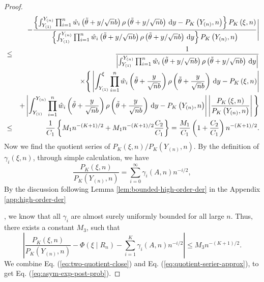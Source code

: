 \begin{proof}
\begin{eqnarray}
 &  & -\frac{\left\{ \int_{Y_{\left(1\right)}}^{Y_{\left(n\right)}}\prod_{i=1}^{n}\hat{w}_{i}\left(\tilde{\theta}+y/\sqrt{n}b\right)\rho\left(\tilde{\theta}+y/\sqrt{n}b\right)\,\mathrm{d} y-P_{K}\left(Y_{\left(n\right)},n\right)\right\} P_{K}\left(\xi,n\right)}{\left\{ \int_{Y_{\left(1\right)}}^{Y_{\left(n\right)}}\prod_{i=1}^{n}\hat{w}_{i}\left(\tilde{\theta}+y/\sqrt{n}b\right)\rho\left(\tilde{\theta}+y/\sqrt{n}b\right)\,\mathrm{d} y\right\} P_{K}\left(Y_{\left(n\right)},n\right)}\Bigg|\nonumber \\
 & \le & \frac{1}{\left|\int_{Y_{\left(1\right)}}^{Y_{\left(n\right)}}\prod_{i=1}^{n}\hat{w}_{i}\left(\tilde{\theta}+y/\sqrt{n}b\right)\rho\left(\tilde{\theta}+y/\sqrt{n}b\right)\,\mathrm{d} y\right|}\\
 && \times\Bigg\{\left|\int_{Y_{\left(1\right)}}^{\xi}\prod_{i=1}^{n}\hat{w}_{i}\left(\tilde{\theta}+\frac{y}{\sqrt{n}b}\right)\rho\left(\tilde{\theta}+\frac{y}{\sqrt{n}b}\right)\,\mathrm{d} y-P_{K}\left(\xi,n\right)\right|\\
 &  & +\left|\int_{Y_{\left(1\right)}}^{Y_{\left(n\right)}}\prod_{i=1}^{n}\hat{w}_{i}\left(\tilde{\theta}+\frac{y}{\sqrt{n}b}\right)\rho\left(\tilde{\theta}+\frac{y}{\sqrt{n}b}\right)\,\mathrm{d} y-P_{K}\left(Y_{\left(n\right)},n\right)\right|\left|\frac{P_{K}\left(\xi,n\right)}{P_{K}\left(Y_{\left(n\right)},n\right)}\right|\Bigg\}\nonumber \\
 & \le & \frac{1}{C_{1}}\left\{ M_{1}n^{-\left(K+1\right)/2}+M_{1}n^{-\left(K+1\right)/2}\frac{C_{2}}{C_{1}}\right\} =\frac{M_{1}}{C_{1}}\left(1+\frac{C_{2}}{C_{1}}\right)n^{-\left(K+1\right)/2}.\label{eq:two-quotient-close}
\end{eqnarray}
Now we find the quotient series of $P_{K}\left(\xi,n\right)/P_{K}\left(Y_{\left(n\right)},n\right)$.
By the definition of $\gamma_{i}\left(\xi,n\right)$, through simple
calculation, we have 
\[
\frac{P_{K}\left(\xi,n\right)}{P_{K}\left(Y_{\left(n\right)},n\right)}=\sum_{i=0}^{\infty}\gamma_{i}\left(A,n\right)n^{-i/2},
\]
 By the discussion following Lemma \ref{lem:bounded-high-order-der} in the Appendix \ref{app:high-order-der} {},
we know that all $\gamma_{i}$ are almost surely uniformly bounded
for all large $n$. Thus, there exists a constant $M_{3}$, such that
\begin{equation}
\left|\frac{P_{K}\left(\xi,n\right)}{P_{K}\left(Y_{\left(n\right)},n\right)}-\Phi\left(\xi\mid R_{n}\right)-\sum_{i=1}^{K}\gamma_{i}\left(A,n\right)n^{-i/2}\right|\le M_{3}n^{-\left(K+1\right)/2}.\label{eq:quotient-serier-approx}
\end{equation}
We combine Eq. (\ref{eq:two-quotient-close}) and Eq. (\ref{eq:quotient-serier-approx}),
to get Eq. (\ref{eq:asym-exp-post-prob}).
\end{proof}
